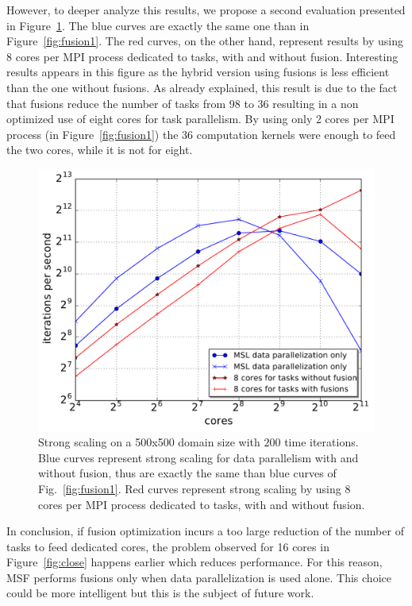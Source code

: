 However, to deeper analyze this results, we propose a second evaluation presented in Figure~\ref{fig:fusion2}. The blue curves are exactly the same one than in Figure~\ref{fig:fusion1}. The red curves, on the other hand, represent results by using 8 cores per MPI process dedicated to tasks, with and without fusion. Interesting results appears in this figure as the hybrid version using fusions is less efficient than the one without fusions. As already explained, this result is due to the fact that fusions reduce the number of tasks from 98 to 36 resulting in a non optimized use of eight cores for task parallelism. By using only 2 cores per MPI process (in Figure~\ref{fig:fusion1}) the 36 computation kernels were enough to feed the two cores, while it is not for eight.

\begin{figure}[!h]\begin{center}
  \includegraphics[width=.6\textwidth]{../results/task_scaling/500_200/withwithout8_close_median.pdf}
  \caption{Strong scaling on a 500x500 domain size with $200$ time iterations. Blue curves represent strong scaling for data parallelism with and without fusion, thus are exactly the same than blue curves of Fig.~\ref{fig:fusion1}. Red curves represent strong scaling by using 8 cores per MPI process dedicated to tasks, with and without fusion.}
  \label{fig:fusion2}
\end{center}\end{figure}
In conclusion, if fusion optimization incurs a too large reduction of the number of tasks to feed dedicated cores, the problem observed for 16 cores in Figure~\ref{fig:close} happens earlier which reduces performance. For this reason, MSF performs fusions only when data parallelization is used alone. This choice could be more intelligent but this is the subject of future work.

